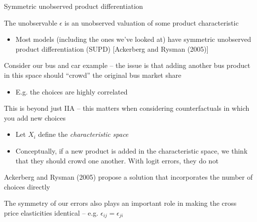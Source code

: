 \documentclass[notes,11pt, aspectratio=169]{beamer}
\newenvironment{wideitemize}{\itemize\addtolength{\itemsep}{10pt}}{\enditemize}
\begin{document}
\begin{frame}{Symmetric unobserved product differentiation}
  \begin{wideitemize}
  \item The unobservable $\epsilon$ is an unobserved valuation of some
    product characteristic
    \begin{itemize}
    \item Most models (including the ones we've looked at) have
      symmetric unobserved product differentiation (SUPD) [Ackerberg and Rysman (2005)]
    \end{itemize}
  \item Consider our bus and car example -- the issue is that adding
    another bus product in this space should ``crowd'' the original bus market share
    \begin{itemize}
    \item E.g. the choices are highly correlated
    \end{itemize}
  \item This is beyond just IIA -- this matters when considering
    counterfactuals in which you add new choices
    \begin{itemize}
    \item Let $X_{i}$ define the \emph{characteristic space}
    \item Conceptually, if a new product is added in the
      characteristic space, we think that they should crowd one
      another. With logit errors, they do not
    \end{itemize}
  \item Ackerberg and Rysman (2005) propose a solution that
    incorporates the number of choices directly
  \item The symmetry of our errors also plays an important role in
    making the cross price elasticities identical --
    e.g. $\epsilon_{ij} = \epsilon_{ji}$
  \end{wideitemize}
\end{frame}
\end{document}
